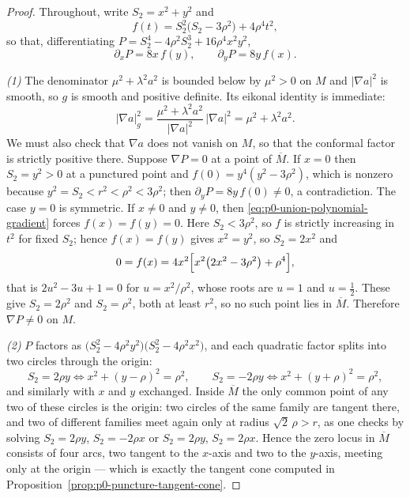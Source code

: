 \begin{proof}
Throughout, write $S_2=x^2+y^2$ and
\[
  f(t)=S_2^2\bigl(S_2-3\rho^2\bigr)+4\rho^4t^2 ,
\]
so that, differentiating $P=S_2^4-4\rho^2S_2^3+16\rho^4x^2y^2$,
\begin{equation}\label{eq:p0-union-polynomial-gradient}
  \partial_xP=8x\,f(y),
  \qquad
  \partial_yP=8y\,f(x).
\end{equation}

\emph{(1)} The denominator $\mu^2+\lambda^2a^2$ is bounded below by $\mu^2>0$ on
$M$ and $|\nabla a|^2$ is smooth, so $g$ is smooth and positive definite.  Its
eikonal identity is immediate:
\[
  |\nabla a|_g^2
  =\frac{\mu^2+\lambda^2a^2}{|\nabla a|^2}\,|\nabla a|^2
  =\mu^2+\lambda^2a^2 .
\]
We must also check that $\nabla a$ does not vanish on $M$, so that the conformal
factor is strictly positive there.  Suppose $\nabla P=0$ at a point of
$\overline M$.  If $x=0$ then $S_2=y^2>0$ at a punctured point and
$f(0)=y^4(y^2-3\rho^2)$, which is nonzero because $y^2=S_2<r^2<\rho^2<3\rho^2$;
then $\partial_yP=8y\,f(0)\ne0$, a contradiction.  The case $y=0$ is symmetric.
If $x\ne0$ and $y\ne0$, then \eqref{eq:p0-union-polynomial-gradient} forces
$f(x)=f(y)=0$.  Here $S_2<3\rho^2$, so $f$ is strictly increasing in $t^2$ for
fixed $S_2$; hence $f(x)=f(y)$ gives $x^2=y^2$, so $S_2=2x^2$ and
\[
  0=f(x)=4x^2\Bigl[x^2\bigl(2x^2-3\rho^2\bigr)+\rho^4\Bigr],
\]
that is $2u^2-3u+1=0$ for $u=x^2/\rho^2$, whose roots are $u=1$ and
$u=\tfrac12$.  These give $S_2=2\rho^2$ and $S_2=\rho^2$, both at least $r^2$,
so no such point lies in $\overline M$.  Therefore $\nabla P\ne0$ on $M$.

\emph{(2)} $P$ factors as $\bigl(S_2^2-4\rho^2y^2\bigr)\bigl(S_2^2-4\rho^2x^2\bigr)$,
and each quadratic factor splits into two circles through the origin:
\[
  S_2=2\rho y \iff x^2+(y-\rho)^2=\rho^2,
  \qquad
  S_2=-2\rho y \iff x^2+(y+\rho)^2=\rho^2 ,
\]
and similarly with $x$ and $y$ exchanged.  Inside $\overline M$ the only common
point of any two of these circles is the origin: two circles of the same family
are tangent there, and two of different families meet again only at radius
$\sqrt2\,\rho>r$, as one checks by solving $S_2=2\rho y$, $S_2=-2\rho x$ or
$S_2=2\rho y$, $S_2=2\rho x$.  Hence the zero locus in $\overline M$ consists of
four arcs, two tangent to the $x$-axis and two to the $y$-axis, meeting only at
the origin --- which is exactly the tangent cone computed in
Proposition~\ref{prop:p0-puncture-tangent-cone}.


\end{proof}
